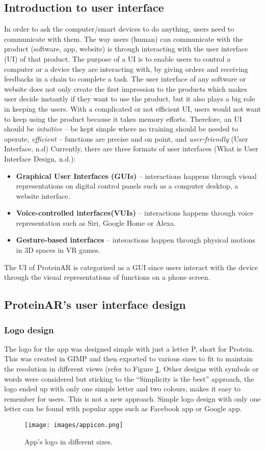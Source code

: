 \subsection{Introduction to user interface}
In order to ask the computer/smart devices to do anything, users need to communicate with them. The way users (human) can communicate with the product (software, app, website) is through interacting with the user interface (UI) of that product. The purpose of a UI is to enable users to control a computer or a device they are interacting with, by giving orders and receiving feedbacks in a chain to complete a task. 
The user interface of any software or website does not only create the first impression to the products which makes user decide instantly if they want to use the product, but it also plays a big role in keeping the users. With a complicated or not efficient UI, users would not want to keep using the product because it takes memory efforts. Therefore, an UI should be \emph{intuitive} – be kept simple where no training should be needed to operate, \emph{efficient} – functions are precise and on point, and \emph{user-friendly} (User Interface, n.d)
Currently, there are three formats of user interfaces (What is User Interface Design, n.d.):
\begin{itemize}
\item \textbf{Graphical User Interfaces (GUIs)} – interactions happens through visual representations on digital control panels such as a computer desktop, a website interface.
\item \textbf{Voice-controlled interfaces(VUIs)} – interactions happens through voice representation such as Siri, Google Home or Alexa.
\item \textbf{Gesture-based interfaces} – interactions happen through physical motions in 3D spaces in VR games.
\end{itemize}
The UI of ProteinAR is categorized as a GUI since users interact with the device through the visual representations of functions on a phone screen. 

\subsection{ProteinAR’s user interface design}
\subsubsection{Logo design}
The logo for the app was designed simple with just a letter P, short for Protein. This was created in GIMP and then exported to various sizes to fit to maintain the resolution in different views (refer to Figure \ref{fig:appicon}. Other designs with symbols or words were considered but sticking to the “Simplicity is the best” approach, the logo ended up with only one simple letter and two colours, makes it easy to remember for users. This is not a new approach. Simple logo design with only one letter can be found with popular apps such as Facebook app or Google app. 
\begin{figure}[!htp]
	\centering
	\texttt{[image: images/appicon.png]}
	\caption{App’s logo in different sizes.}
	\label{fig:appicon}
\end{figure}

